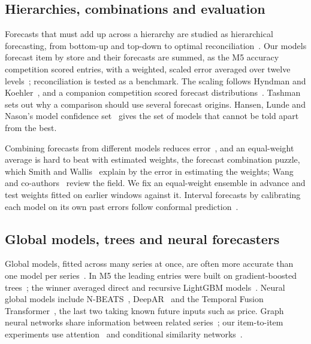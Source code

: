 \subsection{Hierarchies, combinations and evaluation}

Forecasts that must add up across a hierarchy are studied as hierarchical
forecasting, from bottom-up and top-down to optimal
reconciliation~\cite{athanasopoulos2009,hyndman2011,mint}. Our models forecast
item by store and their forecasts are summed, as the M5 accuracy competition
scored entries, with a weighted, scaled error averaged over twelve
levels~\cite{m5accuracy}; reconciliation is tested as a benchmark. The scaling
follows Hyndman and Koehler~\cite{hyndmankoehler}, and a companion competition
scored forecast distributions~\cite{m5uncertainty}. Tashman~\cite{tashman2000}
sets out why a comparison should use several forecast origins. Hansen, Lunde and
Nason's model confidence set~\cite{hansen2011} gives the set of models that
cannot be told apart from the best.

Combining forecasts from different models reduces error~\cite{batesgranger,clemen1989},
and an equal-weight average is hard to beat with estimated weights, the
forecast combination puzzle, which Smith and Wallis~\cite{smithwallis2009}
explain by the error in estimating the weights; Wang and
co-authors~\cite{wang2023} review the field. We fix an equal-weight ensemble in
advance and test weights fitted on earlier windows against it. Interval
forecasts by calibrating each model on its own past errors follow conformal
prediction~\cite{vovk2005}.

\subsection{Global models, trees and neural forecasters}

Global models, fitted across many series at once, are often more accurate than
one model per series~\cite{montero2021}. In M5 the leading entries were built on
gradient-boosted trees~\cite{lightgbm,januschowski2022}; the winner averaged
direct and recursive LightGBM models~\cite{inandjung}. Neural global models
include N-BEATS~\cite{nbeats}, DeepAR~\cite{deepar} and the Temporal Fusion
Transformer~\cite{tft}, the last two taking known future inputs such as price.
Graph neural networks share information between related
series~\cite{graphsage}; our item-to-item experiments use
attention~\cite{transformer} and conditional similarity
networks~\cite{veit2017}.

